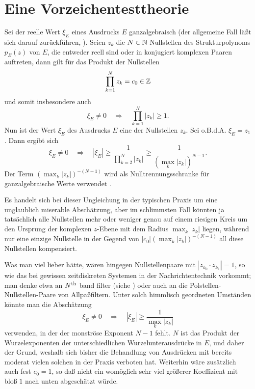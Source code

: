 %
%
%
\pagebreak
\section{Eine Vorzeichentesttheorie}


\begin{remark}[Aufgabenstellung]\label{re:Aufgabenstellung}
Sei der reelle Wert $\xi_E$ eines Ausdrucks $E$ ganzalgebraisch
(der allgemeine Fall läßt sich darauf zurückführen, \cite{BFMS, BFMSS}).
Seien $z_k$ die $N\in\mathbb{N}$ Nullstellen
des Strukturpolynoms $p_E(z)$ von $E$,
die entweder reell sind 
oder in konjugiert komplexen Paaren auftreten,
dann gilt für das Produkt der Nullstellen
\begin{equation*}
  \prod_{k=1}^N z_k = c_0 \in \mathbb{Z}
\end{equation*}
und somit insbesondere auch
\begin{equation*}
  \xi_E\ne0
  \quad\Rightarrow\quad
  \prod_{k=1}^N |z_k| \ge 1.
\end{equation*}
Nun ist der Wert $\xi_E$ des Ausdrucks $E$
eine der Nullstellen $z_k$.
Sei o.B.d.A. $\xi_E = z_1$.
Dann ergibt sich
\begin{equation*}
  \xi_E\ne0
  \quad\Rightarrow\quad
  |\xi_E|
  \ge
  \frac{1}{\prod_{k=2}^N |z_k|}
  \ge
  \frac{1}{(\max_k|z_k|)^{N-1}}.
\end{equation*}
Der Term $(\max_k|z_k|)^{-(N-1)}$ wird als Nulltrennungsschranke 
für ganzalgebraische Werte verwendet \cite{BFMS}.

Es handelt sich bei dieser Ungleichung
in der typischen Praxis um eine unglaublich miserable Abschätzung,
aber im schlimmsten Fall könnten ja tatsächlich alle Nullstellen
mehr oder weniger genau auf einem riesigen Kreis 
um den Ursprung der komplexen $z$-Ebene
mit dem Radius $\max_k|z_k|$ liegen,
während nur eine einzige Nullstelle 
in der Gegend von $|c_0|(\max_k|z_k|)^{-(N-1)}$
all diese Nullstellen kompensiert.

Was man viel lieber hätte,
wären hingegen Nullstellenpaare mit $|z_{k_0}\cdot z_{k_1}|=1$,
 so wie das bei gewissen zeitdiskreten Systemen
 in der Nachrichtentechnik vorkommt;
 man denke etwa an $N^{\rm th}$ band filter (siehe )
 oder auch an die Polstellen-Nullstellen-Paare von Allpaßfiltern.
Unter solch himmlisch geordneten Umständen könnte man die Abschätzung
\begin{equation*}
  \xi_E\ne0
  \quad\Rightarrow\quad
  |\xi_E|
  \ge
  \frac{1}{\max_k|z_k|}
\end{equation*}
verwenden, in der der monströse Exponent $N-1$ fehlt.
$N$ ist das Produkt der Wurzelexponenten 
der unterschiedlichen Wurzelunterausdrücke in $E$,
und daher der Grund,
weshalb sich bisher die Behandlung von Ausdrücken 
mit bereits moderat vielen solchen
in der Praxis verboten hat.
Weiterhin wäre zusätzlich auch fest $c_0=1$,
so daß nicht ein womöglich sehr viel größerer Koeffizient
mit bloß $1$ nach unten abgeschätzt würde.
\end{remark}


